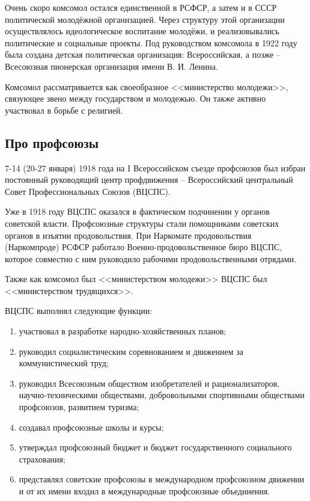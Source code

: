 \documentclass[12pt]{article}
\begin{document}
  Очень скоро комсомол остался единственной в РСФСР, а затем и в СССР политической молодёжной организацией.
  Через структуру этой организации осуществлялось идеологическое воспитание молодёжи, и реализовывались политические и социальные проекты.
  Под руководством комсомола в 1922 году была создана детская политическая организация:
  Всероссийская, а позже -- Всесоюзная пионерская организация имени В. И. Ленина.

  Комсомол рассматривается как своеобразное <<министерство молодежи>>, связующее звено между государством и молодежью.
  Он также активно участвовал в борьбе с религией.

  \subsection{Про профсоюзы}
  7-14 (20-27 января) 1918 года на I Всероссийском съезде профсоюзов был избран постоянный руководящий центр профдвижения -- Всероссийский центральный Совет Профессиональных Союзов (ВЦСПС).

  Уже в 1918 году ВЦСПС оказался в фактическом подчинении у органов советской власти.
  Профсоюзные структуры стали помощниками советских органов в изъятии продовольствия.
  При Наркомате продовольствия (Наркомпроде) РСФСР работало Военно-продовольственное бюро ВЦСПС,
  которое совместно с ним руководило рабочими продовольственными отрядами.

  Также как комсомол был <<министерством молодежи>> ВЦСПС был <<министерством трудящихся>>.

  ВЦСПС выполнял следующие функции:
  \begin{enumerate}
    \item участвовал в разработке народно-хозяйственных планов;
    \item руководил социалистическим соревнованием и движением за коммунистический труд;
    \item руководил Всесоюзным обществом изобретателей и рационализаторов, научно-техническими обществами,
    добровольными спортивными обществами профсоюзов, развитием туризма;
    \item создавал профсоюзные школы и курсы;
    \item утверждал профсоюзный бюджет и бюджет государственного социального страхования;
    \item представлял советские профсоюзы в международном профсоюзном движении
    и от их имени входил в международные профсоюзные объединения.
  \end{enumerate}
\end{document}
